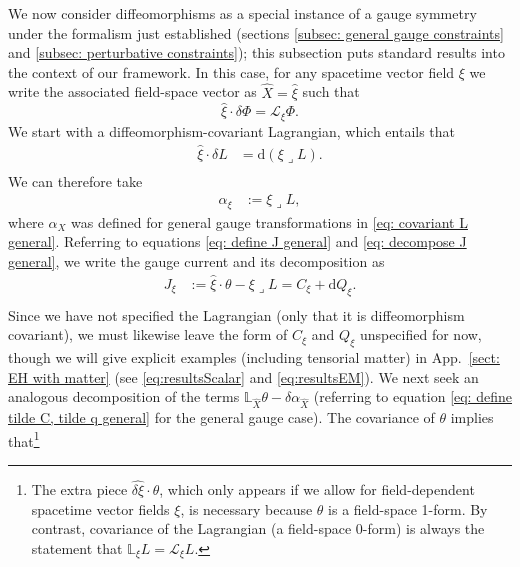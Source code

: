 \documentclass[]{jkpaper}
\theoremstyle{plain}
\theoremstyle{definition}
\newcommand{\sins}{\mathop{\lrcorner}}
\newcommand{\fins}{\cdot}
\newcommand{\sd}{\mathrm {d}}
\newcommand{\fd}{\delta}
\newcommand{\sL}{\mathcal{L}}
\newcommand{\fL}{\mathbb{L}}
\begin{document}
We now consider diffeomorphisms as a special instance of a gauge symmetry under the formalism just established (sections \ref{subsec: general gauge constraints} and \ref{subsec: perturbative constraints}); this subsection puts standard results into the context of our framework.  In this case, for any spacetime vector field $\xi$ we write the associated field-space vector as $\hat{X}=\hat{\xi}$ such that
\begin{equation}
    \hat{\xi}\fins \fd \Phi = \sL_\xi\Phi.
\end{equation}
We start with a diffeomorphism-covariant Lagrangian, which entails that 
\begin{equation}\begin{split}
    \hat{\xi}\fins\fd L &= \sd(\xi\sins L).\\
\end{split}\end{equation}
We can therefore take
\begin{equation}\begin{split}
    \alpha_\xi&:=\xi\sins L,
\end{split}\end{equation}
where $\alpha_{X}$ was defined for general gauge transformations in \eqref{eq: covariant L general}. Referring to equations \eqref{eq: define J general} and \eqref{eq: decompose J general}, we write the gauge current and its decomposition as 
\begin{equation}\begin{split}\label{eq: define J diffeos}
    J_\xi&:=\hat{\xi}\fins\theta-\xi\sins L
    =C_\xi+\sd Q_\xi.\\
\end{split}\end{equation}
Since we have not specified the Lagrangian (only that it is diffeomorphism covariant), we must likewise leave the form of $C_\xi$ and $Q_\xi$ unspecified for now, though we will give explicit examples (including tensorial matter) in App.~\ref{sect: EH with matter} (see \eqref{eq:resultsScalar} and \eqref{eq:resultsEM}). 
We next seek an analogous decomposition of the terms $\fL_{\hat{X}}\theta-\fd\alpha_{\hat{X}}$ (referring to equation \eqref{eq: define tilde C, tilde q general} for the general gauge case).
The covariance of $\theta$ implies that\footnote{The extra piece $\widehat{\delta \xi}\fins\theta$, which only appears if we allow for field-dependent spacetime vector fields $\xi$, is necessary because $\theta$ is a field-space 1-form.  By contrast, covariance of the Lagrangian (a field-space 0-form) is always the statement that $\fL_\xi L=\sL_\xi L$.}
\end{document}
